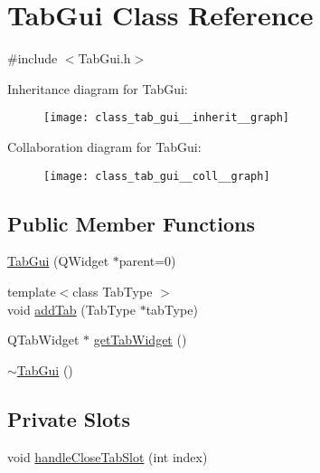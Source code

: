 \hypertarget{class_tab_gui}{\section{Tab\-Gui Class Reference}
\label{class_tab_gui}
}


{\ttfamily \#include $<$Tab\-Gui.\-h$>$}



Inheritance diagram for Tab\-Gui\-:\nopagebreak
\begin{figure}[H]
\begin{center}
\leavevmode
\texttt{[image: class\_tab\_gui\_\_inherit\_\_graph]}
\end{center}
\end{figure}


Collaboration diagram for Tab\-Gui\-:\nopagebreak
\begin{figure}[H]
\begin{center}
\leavevmode
\texttt{[image: class\_tab\_gui\_\_coll\_\_graph]}
\end{center}
\end{figure}
\subsection*{Public Member Functions}
\begin{DoxyCompactItemize}
\item 
\hyperlink{class_tab_gui_a6ed13bb65c170b211011961f0bc7b89d}{Tab\-Gui} (Q\-Widget $\ast$parent=0)
\item 
{\footnotesize template$<$class Tab\-Type $>$ }\\void \hyperlink{class_tab_gui_a4051a0139cda9d91fc96b837d27b90d7}{add\-Tab} (Tab\-Type $\ast$tab\-Type)
\item 
Q\-Tab\-Widget $\ast$ \hyperlink{class_tab_gui_a9defb9e098e6da5c32a5c7aa15aa0fee}{get\-Tab\-Widget} ()
\item 
\hyperlink{class_tab_gui_a6bfb98f565ad1fd2dd2ea1785293fbdc}{$\sim$\-Tab\-Gui} ()
\end{DoxyCompactItemize}
\subsection*{Private Slots}
\begin{DoxyCompactItemize}
\item 
void \hyperlink{class_tab_gui_a16e228f9aefd7a1c4d59e0fd79e4b611}{handle\-Close\-Tab\-Slot} (int index)
\end{DoxyCompactItemize}
